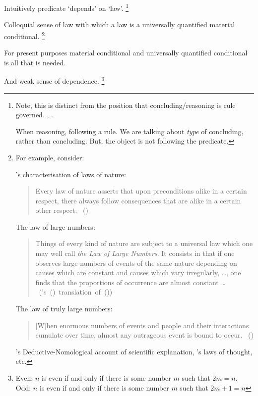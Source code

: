 \begin{note}
  Intuitively predicate `depends' on `law'.%
  \footnote{
    Note, this is distinct from the position that concluding/reasoning is rule governed.
    \cite{Boghossian:2008vf,Boghossian:2012vb}, \cite{Broome:2002aa}.

    When reasoning, following a rule.
    We are talking about \emph{type} of concluding, rather than concluding.
    But, the object is not following the predicate.
  }

  Colloquial sense of law with which a law is a universally quantified material conditional.%
  \footnote{
    For example, consider:

    \citeauthor{Helmholtz:1977aa}'s characterisation of laws of nature:%
    \begin{quote}
      \nocite{Wilson:2006aa}
      Every law of nature asserts that upon preconditions alike in a certain respect, there always follow consequences that are alike in a certain other respect.%
      \mbox{ }\hfill\mbox{(\citeyear[122]{Helmholtz:1977aa})}
    \end{quote}
    The law of large numbers:
    \begin{quote}
      Things of every kind of nature are subject to a universal law which one may well call \emph{the Law of Large Numbers}.
      It consists in that if one observes large numbers of events of the same nature depending on causes which are constant and causes which vary irregularly, \dots, one finds that the proportions of occurrence are almost constant \dots\newline
      \mbox{ }\hfill\mbox{(\citeauthor{Seneta:2013aa}'s (\citeyear[9--10]{Seneta:2013aa}) translation of (\cite[7]{Poisson:1837aa}))}
    \end{quote}
    The law of truly large numbers:
    \begin{quote}
      [W]hen enormous numbers of events and people and their interactions cumulate over time, almost any outrageous event is bound to occur.%
      \mbox{ }\hfill\mbox{(\cite[853]{Diaconis:1989aa})}
    \end{quote}
    \citeauthor{Hempel:1965aa}'s Deductive-Nomological account of scientific explanation, \citeauthor{Boole:1854aa}'s laws of thought, etc.
  }

  For present purposes material conditional and universally quantified conditional is all that is needed.

  And weak sense of dependence.%
  \footnote{
    Even: \(n\) is even if and only if there is some number \(m\) such that \(2m = n\).
    Odd: \(n\) is even if and only if there is some number \(m\) such that \(2m + 1 = n\)

}
\end{note}
